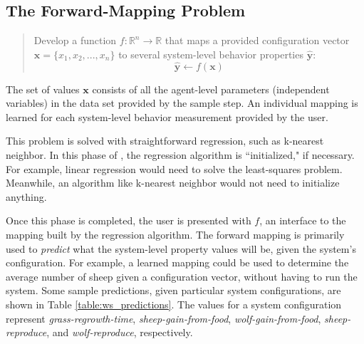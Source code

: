 \subsection{The Forward-Mapping Problem}



\begin{quote} Develop a function $f: \mathbb{R}^n \rightarrow \mathbb{R}$ that maps a provided configuration vector $\mathbf x = \{x_1, x_2, ..., x_n \}$ to several system-level behavior properties $\hat {\mathbf y}$:
\[\hat {\mathbf y} \leftarrow f(\mathbf x)\]
\end{quote}
The set of values $\mathbf x$ consists of all the agent-level parameters (independent variables) in the data set provided by the sample step.
An individual mapping is learned for each system-level behavior measurement provided by the user.

This problem is solved with straightforward regression, such as k-nearest neighbor.
In this phase of \fw, the regression algorithm is ``initialized," if necessary.
For example, linear regression would need to solve the least-squares problem.
Meanwhile, an algorithm like k-nearest neighbor would not need to initialize anything.

Once this phase is completed, the user is presented with $f$, an interface to the mapping built by the regression algorithm.
The forward mapping is primarily used to \textit{predict} what the system-level property values will be, given the system's configuration.
For example, a learned mapping could be used to determine the average number of sheep given a configuration vector, without having to run the system.
Some sample predictions, given particular system configurations, are shown in Table \ref{table:ws_predictions}.
The values for a system configuration represent \textit{grass-regrowth-time}, \textit{sheep-gain-from-food}, \textit{wolf-gain-from-food}, \textit{sheep-reproduce}, and \textit{wolf-reproduce}, respectively.

